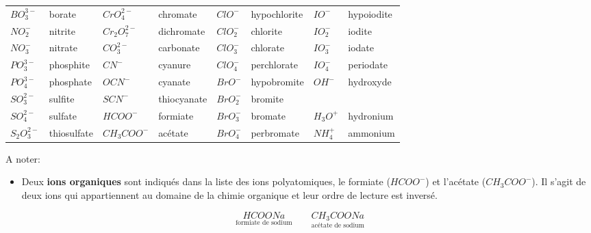 \documentclass[
  11pt,
  a4paper,
  openany]{book}
\providecommand{\tightlist}{%
  \setlength{\itemsep}{0pt}\setlength{\parskip}{0pt}}
\begin{document}
\begin{longtable}[]{@{}
  >{\raggedright\arraybackslash}p{}
  >{\raggedright\arraybackslash}p{}
  >{\raggedright\arraybackslash}p{}
  >{\raggedright\arraybackslash}p{}
  >{\raggedright\arraybackslash}p{}
  >{\raggedright\arraybackslash}p{}
  >{\raggedright\arraybackslash}p{}
  >{\raggedright\arraybackslash}p{}@{}}
\toprule()
\endhead
\(BO_3^{3-}\) & borate & \(CrO_4^{2-}\) & chromate & \(ClO^{-}\) & hypochlorite & \(IO^{-}\) & hypoiodite \\
\(NO_2^{-}\) & nitrite & \(Cr_2O_7^{2-}\) & dichromate & \(ClO_2^{-}\) & chlorite & \(IO_2^{-}\) & iodite \\
\(NO_3^{-}\) & nitrate & \(CO_3^{2-}\) & carbonate & \(ClO_3^{-}\) & chlorate & \(IO_3^{-}\) & iodate \\
\(PO_3^{3-}\) & phosphite & \(CN^{-}\) & cyanure & \(ClO_4^{-}\) & perchlorate & \(IO_4^{-}\) & periodate \\
\(PO_4^{3-}\) & phosphate & \(OCN^{-}\) & cyanate & \(BrO^{-}\) & hypobromite & \(OH^{-}\) & hydroxyde \\
\(SO_3^{2-}\) & sulfite & \(SCN^{-}\) & thiocyanate & \(BrO_2^{-}\) & bromite & & \\
\(SO_4^{2-}\) & sulfate & \(HCOO^{-}\) & formiate & \(BrO_3^{-}\) & bromate & \(H_3O^{+}\) & hydronium \\
\(S_2O_3^{2-}\) & thiosulfate & \(CH_3COO^{-}\) & acétate & \(BrO_4^{-}\) & perbromate & \(NH_4^{+}\) & ammonium \\
\bottomrule()
\end{longtable}

A noter:

\begin{itemize}
\tightlist
\item
  Deux \textbf{ions organiques} sont indiqués dans la liste des ions polyatomiques, le formiate (\(HCOO^-\)) et l'acétate (\(CH_3COO^-\)). Il s'agit de deux ions qui appartiennent au domaine de la chimie organique et leur ordre de lecture est inversé.
\end{itemize}

\[ \underset{\text{formiate de sodium}}{HCOONa} \qquad \underset{\text{acétate de sodium}}{CH_3COONa} \]
\end{document}
